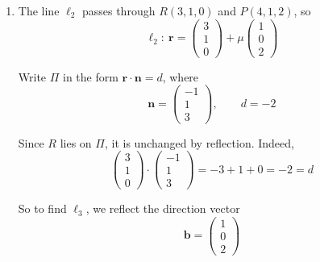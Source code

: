 \documentclass[leqno]{article}
\begin{document}
\begin{enumerate}[
  label=\textbf{\arabic*.},
  leftmargin=*,
  topsep=0pt,
  partopsep=0pt,
  parsep=0pt
]
\begin{tcolorbox}[colback=white, colframe=scarlet, title={\textbf{Solution}}, breakable, grow to left by=6mm, grow to right by=10mm]
\begin{enumerate}[label=\textbf{(\alph*)}]
Using the point \(P(4,1,2)\), the plane equation is
\[
\begin{pmatrix}2\\5\\-1\end{pmatrix}\cdot
\left(
\begin{pmatrix}x\\y\\z\end{pmatrix}
-
\begin{pmatrix}4\\1\\2\end{pmatrix}
\right)=0
\]

So
\begin{align*}
2(x-4)+5(y-1)-(z-2)&=0\\
2x-8+5y-5-z+2&=0\\
2x+5y-z-11&=0
\end{align*}

Therefore a Cartesian equation of the plane containing \(P,Q,R\) is
\[
2x+5y-z-11=0
\]

  \item The line \(\ell_2\) passes through \(R(3,1,0)\) and \(P(4,1,2)\), so
\[
\ell_2:\ \mathbf r=
\begin{pmatrix}3\\1\\0\end{pmatrix}
+\mu
\begin{pmatrix}1\\0\\2\end{pmatrix}
\]

Write \(\Pi\) in the form \(\mathbf r\cdot\mathbf n=d\), where
\[
\mathbf n=\begin{pmatrix}-1\\1\\3\end{pmatrix},
\qquad
d=-2
\]

Since \(R\) lies on \(\Pi\), it is unchanged by reflection. Indeed,
\[
\begin{pmatrix}3\\1\\0\end{pmatrix}\cdot
\begin{pmatrix}-1\\1\\3\end{pmatrix}
=-3+1+0=-2=d
\]

So to find \(\ell_3\), we reflect the direction vector
\[
\mathbf b=\begin{pmatrix}1\\0\\2\end{pmatrix}
\]


\end{enumerate}
\end{tcolorbox}
\end{enumerate}
\end{document}
